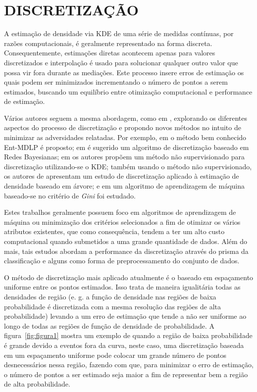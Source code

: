 \chapter{DISCRETIZAÇÃO}
A estimação de densidade via \ac{KDE} de uma série de medidas contínuas, por razões computacionais, é geralmente representado na forma discreta. Consequentemente, estimações diretas acontecem apenas para valores discretizados \cite{jones1989discretized} e interpolação é usado para solucionar qualquer outro valor que possa vir fora durante as mediações. Este processo insere erros de estimação os quais podem ser minimizados incrementando o número de pontos a serem estimados, buscando um equilíbrio entre otimização computacional e performance de estimação.

Vários autores seguem a mesma abordagem, como em \cite{jones1989discretized}, explorando os diferentes aspectos do processo de discretização e propondo novos métodos no intuito de minimizar as adversidades relatadas. Por exemplo, em \cite{fayyad1993multi} o método bem conhecido Ent-MDLP é proposto; em \cite{friedman1996discretizing} é sugerido um algoritmo de discretização baseado em Redes Bayesianas; em \cite{biba2007unsupervised} os autores propõem um método não supervisionado para discretização utilizando-se o \ac{KDE}; também usando o método não supervisionado, os autores de \cite{schmidberger2005unsupervised} apresentam um estudo de discretização aplicado à estimação de densidade baseado em árvore; e em \cite{zhang2007discretization} um algoritmo de aprendizagem de máquina baseado-se no critério de \textit{Gini} foi estudado. 

Estes trabalhos geralmente possuem foco em algoritmos de aprendizagem de máquina ou minimização dos critérios selecionados a fim de otimizar os vários atributos existentes, que como consequência, tendem a ter um alto custo computacional quando submetidos a uma grande quantidade de dados. Além do mais, tais estudos abordam a performance da discretização através do prisma da classificação e alguns como forma de preprocessamento do conjunto de dados.

O método de discretização mais aplicado atualmente é o baseado em espaçamento uniforme entre os pontos estimados. Isso trata de maneira igualitária todas as densidades de região (e. g. a função de densidade nas regiões de baixa probabilidade é discretizada com a mesma resolução das regiões de alta probabilidade) levando a um erro de estimação que tende a não ser uniforme ao longo de todas as regiões de função de densidade de probabilidade.
A figura~\ref{fig:figura1} mostra um exemplo de quando a região de baixa probabilidade é grande devido a eventos fora da curva, neste caso, uma discretização baseada em um espaçamento uniforme  pode colocar um grande número de pontos desnecessários nessa região, fazendo com que, para minimizar o erro de estimação, o número de pontos a ser estimado seja maior a fim de representar bem a região de alta probabilidade. %


